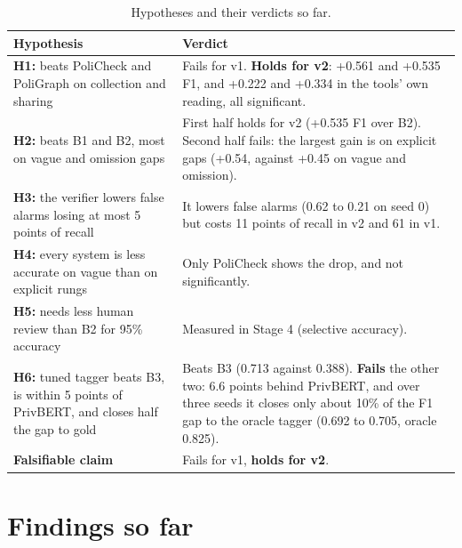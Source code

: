 \documentclass[11pt,a4paper]{article}
\newcommand{\rowline}{\specialrule{0.2pt}{3pt}{3pt}}
\begin{document}
\begin{table}[H]
\centering
\small
\begin{tabular}{L{6.6cm}L{8.2cm}}
\toprule
Hypothesis & Verdict \\
\midrule
\textbf{H1:} beats PoliCheck and PoliGraph on collection and sharing &
Fails for v1. \textbf{Holds for v2}: +0.561 and +0.535 F1, and +0.222 and +0.334 in the tools'
own reading, all significant. \\ \rowline
\textbf{H2:} beats B1 and B2, most on vague and omission gaps &
First half holds for v2 (+0.535 F1 over B2). Second half fails: the largest gain is on explicit
gaps (+0.54, against +0.45 on vague and omission). \\ \rowline
\textbf{H3:} the verifier lowers false alarms losing at most 5 points of recall &
It lowers false alarms (0.62 to 0.21 on seed 0) but costs 11 points of recall in v2 and 61 in
v1. \\ \rowline
\textbf{H4:} every system is less accurate on vague than on explicit rungs &
Only PoliCheck shows the drop, and not significantly. \\ \rowline
\textbf{H5:} needs less human review than B2 for 95\% accuracy &
Measured in Stage 4 (selective accuracy). \\ \rowline
\textbf{H6:} tuned tagger beats B3, is within 5 points of PrivBERT, and closes half the gap to
gold & Beats B3 (0.713 against 0.388). \textbf{Fails} the other two: 6.6 points behind PrivBERT,
and over three seeds it closes only about 10\% of the F1 gap to the oracle tagger (0.692 to 0.705,
oracle 0.825). \\ \rowline
\textbf{Falsifiable claim} & Fails for v1, \textbf{holds for v2}. \\
\bottomrule
\end{tabular}
\caption{Hypotheses and their verdicts so far.}
\end{table}

\section{Findings so far}
\end{document}
